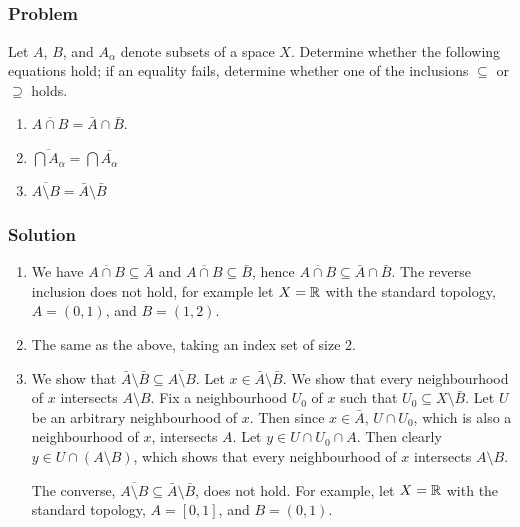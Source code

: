 \setcounter{subsection}{7} %
\subsection{}
\subsubsection{Problem}
Let $A$, $B$, and $A_\alpha$ denote subsets of a space $X$. Determine whether the following equations hold; if an equality fails, determine whether one of the inclusions $\subseteq$ or $\supseteq$ holds.
\begin{enumerate}
 \item $\overline{A \cap B} = \bar A \cap \bar B$.
 \item $\overline{\bigcap A_\alpha} = \bigcap \overline{A_\alpha}$
 \item $\overline{A \setminus B} = \bar A \setminus \bar B$
\end{enumerate}
 
\subsubsection{Solution}
\begin{enumerate}
 \item We have $\overline{A \cap B} \subseteq \bar A$ and $\overline{A \cap B} \subseteq \bar B$, hence $\overline{A \cap B} \subseteq \bar A \cap \bar B$. The reverse inclusion does not hold, for example let $X = \mathbb R$ with the standard topology, $A = (0,1)$, and $B = (1,2)$.
 
 \item The same as the above, taking an index set of size 2.
 
 \item We show that $\bar A \setminus \bar B \subseteq \overline{A \setminus B}$. Let $x \in \bar A \setminus \bar B$. We show that every neighbourhood of $x$ intersects $A \setminus B$. Fix a neighbourhood $U_0$ of $x$ such that $U_0 \subseteq X \setminus \bar B$. Let $U$ be an arbitrary neighbourhood of $x$. Then since $x \in \bar A$, $U \cap U_0$, which is also a neighbourhood of $x$, intersects $A$. Let $y \in U \cap U_0 \cap A$. Then clearly $y \in U \cap (A \setminus B)$, which shows that every neighbourhood of $x$ intersects $A \setminus B$.
 
 The converse, $\overline{A \setminus B} \subseteq \bar A \setminus \bar B$, does not hold. For example, let $X = \mathbb R$ with the standard topology, $A = [0,1]$, and $B = (0,1)$. 
\end{enumerate}


